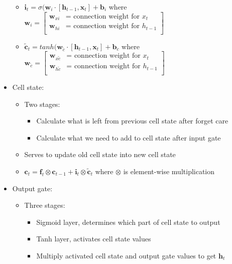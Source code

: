 \begin{itemize}
\begin{itemize}
        \item $\boldsymbol{i}_t = \sigma (\boldsymbol{w}_i \cdot [ \boldsymbol{h}_{t-1}, \boldsymbol{x}_t ] + \boldsymbol{b}_i $ where $\boldsymbol{w}_i = \begin{bmatrix}
        \boldsymbol{w}_{xi} & \textrm{= connection weight for } x_t \\
        \boldsymbol{w}_{hi} & \textrm{= connection weight for } h_{t-1} \\
        \end{bmatrix}$
        \item $\boldsymbol{\tilde{c}}_t = tanh (\boldsymbol{w}_{\tilde{c}} \cdot [ \boldsymbol{h}_{t-1}, \boldsymbol{x}_t ] + \boldsymbol{b}_c $ where $\boldsymbol{w}_{\tilde{c}} = \begin{bmatrix}
        \boldsymbol{w}_{x{\tilde{c}}} & \textrm{= connection weight for } x_t \\
        \boldsymbol{w}_{h{\tilde{c}}} & \textrm{= connection weight for } h_{t-1} \\
        \end{bmatrix}$
    \end{itemize}
    \item Cell state:
    \begin{itemize}
        \item Two stages:
        \begin{itemize}
            \item Calculate what is left from previous cell state after forget care
            \item Calculate what we need to add to cell state after input gate
        \end{itemize}
        \item Serves to update old cell state into new cell state
        \item $\boldsymbol{c}_t = \boldsymbol{f}_t \otimes \boldsymbol{c}_{t-1} + \boldsymbol{i}_t \otimes \boldsymbol{\tilde{c}}_{t}$ where $\otimes$ is element-wise multiplication
    \end{itemize}
    \item Output gate:
    \begin{itemize}
        \item Three stages:
        \begin{itemize}
            \item Sigmoid layer, determines which part of cell state to output
            \item Tanh layer, activates cell state values
            \item Multiply activated cell state and output gate values to get $\boldsymbol{h}_t$

\end{itemize}
\end{itemize}
\end{itemize}

